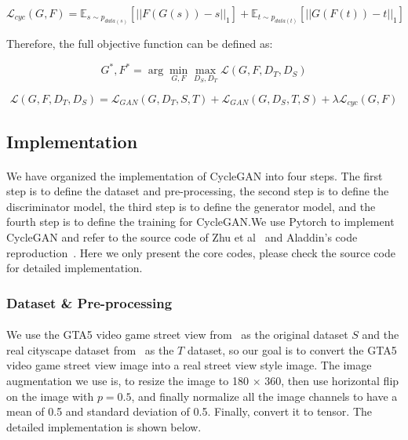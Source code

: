 \begin{equation}
    \mathcal{L}_{cyc}(G,F) = \mathbb{E}_{s \sim p_{data(s)}}[||F(G(s)) - s||_{1}] + \mathbb{E}_{t \sim p_{data(t)}}[||G(F(t)) - t||_{1}]
\end{equation}

Therefore, the full objective function can be defined as:

\begin{equation}
    G^*,F^* = \arg \mathop{\min}_{G,F} \mathop{\max}_{D_S,D_T} \mathcal{L}(G,F,D_T,D_S)
\end{equation}

\begin{equation}
    \mathcal{L}(G,F,D_T,D_S) = \mathcal{L}_{GAN}(G,D_T,S,T) + \mathcal{L}_{GAN}(G,D_S,T,S) + \lambda \mathcal{L}_{cyc}(G,F)
\end{equation}

\subsection{Implementation}
\paragraph{}
We have organized the implementation of CycleGAN into four steps. The first step is to define the dataset and pre-processing, the second step is to define the discriminator model, the third step is to define the generator model, and the fourth step is to define the training for CycleGAN.\@ We use Pytorch to implement CycleGAN and refer to the source code of Zhu et al~\cite{zhu2017unpaired} and Aladdin's code reproduction~\cite{CycleGANcode}. Here we only present the core codes, please check the source code for detailed implementation.

\subsubsection{Dataset \& Pre-processing}
\paragraph{}
We use the GTA5 video game street view from~\cite{richter2016playing} as the original dataset $S$ and the real cityscape dataset from~\cite{cordts2016cityscapes} as the $T$ dataset, so our goal is to convert the GTA5 video game street view image into a real street view style image. The image augmentation we use is, to resize the image to 180 $\times$ 360, then use horizontal flip on the image with $p = 0.5$, and finally normalize all the image channels to have a mean of 0.5 and standard deviation of 0.5. Finally, convert it to tensor. The detailed implementation is shown below.


